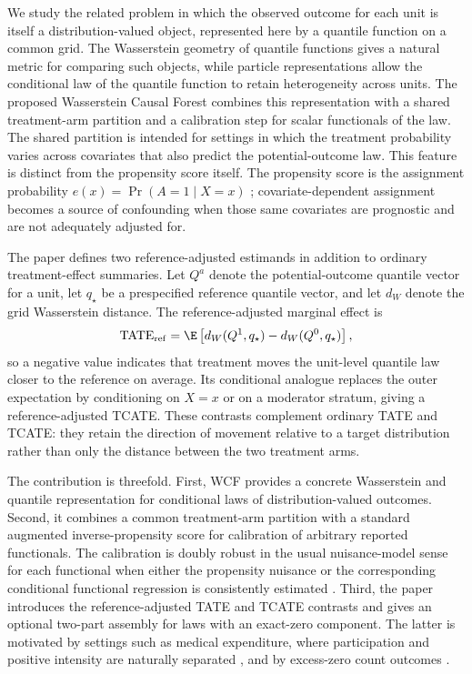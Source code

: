 We study the related problem in which the observed outcome for each unit is itself a distribution-valued object, represented here by a quantile function on a common grid. The Wasserstein geometry of quantile functions gives a natural metric for comparing such objects, while particle representations allow the conditional law of the quantile function to retain heterogeneity across units. The proposed Wasserstein Causal Forest combines this representation with a shared treatment-arm partition and a calibration step for scalar functionals of the law. The shared partition is intended for settings in which the treatment probability varies across covariates that also predict the potential-outcome law. This feature is distinct from the propensity score itself. The propensity score is the assignment probability $e(x)=\Pr(A=1\mid X=x)$ \citep{rosenbaum1983propensity}; covariate-dependent assignment becomes a source of confounding when those same covariates are prognostic and are not adequately adjusted for.

The paper defines two reference-adjusted estimands in addition to ordinary treatment-effect summaries. Let $Q^a$ denote the potential-outcome quantile vector for a unit, let $q_\star$ be a prespecified reference quantile vector, and let $d_W$ denote the grid Wasserstein distance. The reference-adjusted marginal effect is
\[
\mathrm{TATE}_{\mathrm{ref}}
=\E\left[d_W(Q^1,q_\star)-d_W(Q^0,q_\star)\right],
\]
so a negative value indicates that treatment moves the unit-level quantile law closer to the reference on average. Its conditional analogue replaces the outer expectation by conditioning on $X=x$ or on a moderator stratum, giving a reference-adjusted TCATE. These contrasts complement ordinary TATE and TCATE: they retain the direction of movement relative to a target distribution rather than only the distance between the two treatment arms.

The contribution is threefold. First, WCF provides a concrete Wasserstein and quantile representation for conditional laws of distribution-valued outcomes. Second, it combines a common treatment-arm partition with a standard augmented inverse-propensity score for calibration of arbitrary reported functionals. The calibration is doubly robust in the usual nuisance-model sense for each functional when either the propensity nuisance or the corresponding conditional functional regression is consistently estimated \citep{bang2005doubly,chernozhukov2018double}. Third, the paper introduces the reference-adjusted TATE and TCATE contrasts and gives an optional two-part assembly for laws with an exact-zero component. The latter is motivated by settings such as medical expenditure, where participation and positive intensity are naturally separated \citep{duan1983medical}, and by excess-zero count outcomes \citep{mullahy1986modified}.

